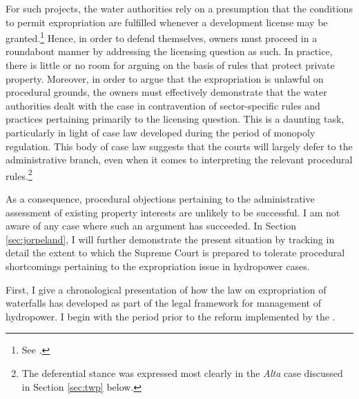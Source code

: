 For such projects, the water authorities rely on a presumption that the conditions to permit expropriation are fulfilled whenever a development license may be granted.\footnote{See \cite{flatby08}.} Hence, in order to defend themselves, owners must proceed in a roundabout manner by addressing the licensing question as such. In practice, there is little or no room for arguing on the basis of rules that protect private property. Moreover, in order to argue that the expropriation is unlawful on procedural grounds, the owners must effectively demonstrate that the water authorities dealt with the case in contravention of sector-specific rules and practices pertaining primarily to the licensing question. This is a daunting task, particularly in light of case law developed during the period of monopoly regulation. This body of case law suggests that the courts will largely defer to the administrative branch, even when it comes to interpreting the relevant procedural rules.\footnote{The deferential stance was expressed most clearly in the {\it Alta} case discussed in Section \ref{sec:twp} below.}

As a consequence, procedural objections pertaining to the administrative assessment of existing property interests are unlikely to be successful. I am not aware of any case where such an argument has succeeded. In Section \ref{sec:jorpeland}, I will further demonstrate the present situation by tracking in detail the extent to which the Supreme Court is prepared to tolerate procedural shortcomings pertaining to the expropriation issue in hydropower cases.%

First, I give a chronological presentation of how the law on expropriation of waterfalls has developed as part of the legal framework for management of hydropower. I begin with the period prior to the reform implemented by the \cite{ea90}.

